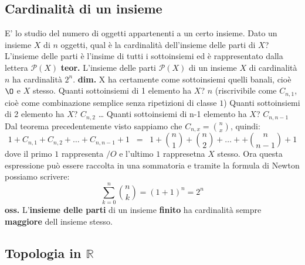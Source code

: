 \subsection*{Cardinalità di un insieme}
E' lo studio del numero di oggetti appartenenti a un certo insieme.
\newline
Dato un insieme $X$ di $n$ oggetti, qual è la cardinalità dell'insieme delle parti di $X$? L'insieme delle parti è l'insime di tutti i sottoinsiemi ed è rappresentato dalla lettera $\mathcal{P}(X)$
\newline
\newline
\textbf{teor.} L'insieme delle parti $\mathcal{P}(X)$ di un insieme $X$ di cardinalità $n$ ha cardinalità $2^n$.
\newline
\textbf{dim.} X ha certamente come sottoinsiemi quelli banali, cioè $\O$ e $X$ stesso.
\newline
Quanti sottoinsiemi di 1 elemento ha $X$? $n$ (riscrivibile come $C_{n,1}$, cioè come combinazione semplice senza ripetizioni di classe $1$)
\newline
Quanti sottoinsiemi di 2 elemento ha $X$? $C_{n,2}$
\newline
\dots
\newline
Quanti sottoinsiemi di n-1 elemento ha $X$? $C_{n,n-1}$
\newline
Dal teorema precedentemente visto sappiamo che $C_{n,x} = \binom{n}{x}$, quindi:
\[
    1+C_{n,1}+C_{n,2}+\dots+C_{n,n-1}+1 \;\;=\;\; 1+\binom{n}{1}+\binom{n}{2}+\dots++\binom{n}{n-1}+1
\] 
dove il primo $1$ rappresenta $/O$ e l'ultimo $1$ rappresetna $X$ stesso.
\newline
Ora questa espressione può essere raccolta in una sommatoria e tramite la formula di Newton possiamo scrivere:
\[
    \sum_{k=0}^n\binom{n}{k} = (1+1)^n = 2^n
\]  
\newline
\textbf{oss.} L'\textbf{insieme delle parti} di un insieme \textbf{finito} ha cardinalità sempre \textbf{maggiore} dell insieme stesso.

\subsection*{Topologia in $\mathbb{R}$}
